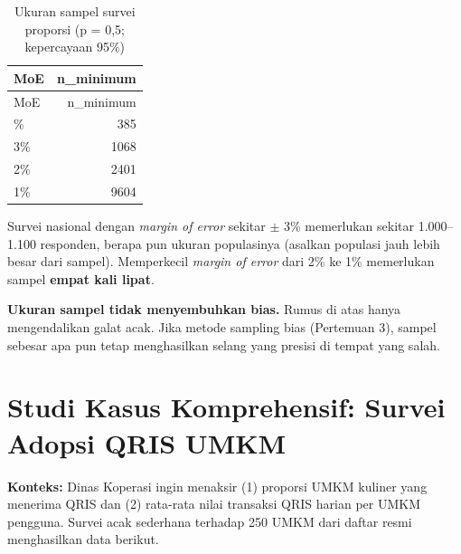 \documentclass[
  indonesian,
  letterpaper,
]{book}
\begin{document}
\begin{longtable}[]{@{}lr@{}}
\caption{Ukuran sampel survei proporsi (p = 0,5; kepercayaan
95\%)}\tabularnewline
\toprule\noalign{}
MoE & n\_minimum \\
\midrule\noalign{}
\endfirsthead
\toprule\noalign{}
MoE & n\_minimum \\
\midrule\noalign{}
\endhead
\bottomrule\noalign{}
\endlastfoot
5\% & 385 \\
3\% & 1068 \\
2\% & 2401 \\
1\% & 9604 \\
\end{longtable}

Survei nasional dengan \emph{margin of error} sekitar \(\pm\) 3\%
memerlukan sekitar 1.000--1.100 responden, berapa pun ukuran populasinya
(asalkan populasi jauh lebih besar dari sampel). Memperkecil
\emph{margin of error} dari 2\% ke 1\% memerlukan sampel \textbf{empat
kali lipat}.

\begin{tcolorbox}[enhanced jigsaw, arc=.35mm, bottomrule=.15mm, bottomtitle=1mm, breakable, colback=white, colbacktitle=quarto-callout-warning-color!10!white, colframe=quarto-callout-warning-color-frame, coltitle=black, left=2mm, leftrule=.75mm, opacityback=0, opacitybacktitle=0.6, rightrule=.15mm, title=\textcolor{quarto-callout-warning-color}{\faExclamationTriangle}\hspace{0.5em}{Peringatan}, titlerule=0mm, toprule=.15mm, toptitle=1mm]

\textbf{Ukuran sampel tidak menyembuhkan bias.} Rumus di atas hanya
mengendalikan galat acak. Jika metode sampling bias (Pertemuan 3),
sampel sebesar apa pun tetap menghasilkan selang yang presisi di tempat
yang salah.

\end{tcolorbox}

\section{Studi Kasus Komprehensif: Survei Adopsi QRIS
UMKM}\label{studi-kasus-komprehensif-survei-adopsi-qris-umkm}

\textbf{Konteks:} Dinas Koperasi ingin menaksir (1) proporsi UMKM
kuliner yang menerima QRIS dan (2) rata-rata nilai transaksi QRIS harian
per UMKM pengguna. Survei acak sederhana terhadap 250 UMKM dari daftar
resmi menghasilkan data berikut.
\end{document}
